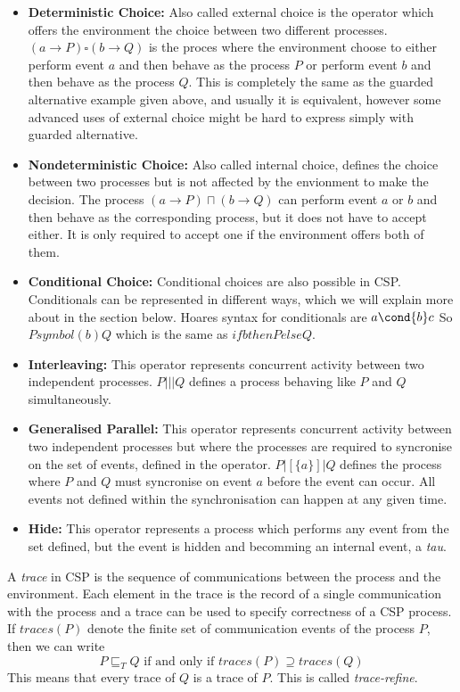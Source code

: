 \begin{itemize}
    \item \textbf{Deterministic Choice:} Also called external choice is the operator which offers the environment the choice between two different processes. $(a \rightarrow P) \square (b \rightarrow Q)$ is the proces where the environment choose to either perform event $a$ and then behave as the process $P$ or perform event $b$ and then behave as the process $Q$. This is completely the same as the guarded alternative example given above, and usually it is equivalent, however some advanced uses of external choice might be hard to express simply with guarded alternative.
    \item \textbf{Nondeterministic Choice:} Also called internal choice, defines the choice between two processes but is not affected by the envionment to make the decision.
    The process $(a \rightarrow P) \sqcap (b \rightarrow Q)$ can perform event $a$ or $b$ and then behave as the corresponding process, but it does not have to accept either. It is only required to accept one if the environment offers both of them.
    \item \textbf{Conditional Choice:} Conditional choices are also possible in CSP. Conditionals can be represented in different ways, which we will explain more about in the \cspm{} section below. Hoares syntax for conditionals are $a \cond{b} c$ %
    So $ P symbol(b) Q$ which is the same as $if b then P else Q$.
    \item \textbf{Interleaving:} This operator represents concurrent activity between two independent processes. $ P  |||  Q$ defines a process behaving like $P$ and $Q$ simultaneously.
     \item \textbf{Generalised Parallel:} This operator represents concurrent activity between two independent processes but where the processes are required to syncronise on the set of events, defined in the operator. $ P  |[\{ a \}]|  Q$ defines the process where $P$ and $Q$ must syncronise on event $a$ before the event can occur. All events not defined within the synchronisation can happen at any given time.
     \item \textbf{Hide:} This operator represents a process which performs any event from the set defined, but the event is hidden and becomming an internal event, a \textit{tau}.
\end{itemize}

A \textit{trace} in CSP is the sequence of communications between the process and the environment. Each element in the trace is the record of a single communication with the process and a trace can be used to specify correctness of a CSP process. If $traces(P)$ denote the finite set of communication events of the process $P$, then we can write $$ P \sqsubseteq_T Q \text{ if and only if } traces(P) \supseteq traces(Q)$$
This means that every trace of $Q$ is a trace of $P$. This is called \textit{trace-refine}.

